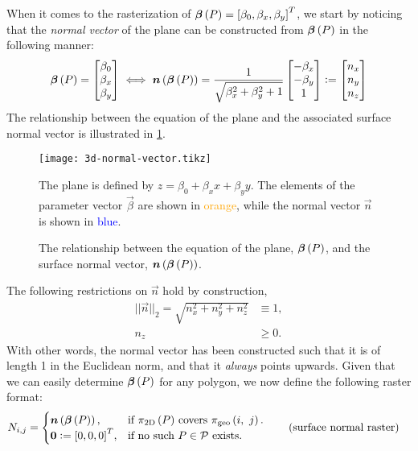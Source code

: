 When it comes to the rasterization of $\boldsymbol{\beta}\left(P\right) = {[\beta_0, \beta_x, \beta_y]}^T$, we start by noticing that the \textit{normal vector} of the plane can be constructed from $\boldsymbol{\beta}\left(P\right)$ in the following manner:
\begin{equation*}
  \boldsymbol{\beta}\left(P\right)
  =
  \begin{bmatrix}
    \beta_0\\
    \beta_x\\
    \beta_y\\
  \end{bmatrix}
  \iff
  \boldsymbol{n}\left(\boldsymbol{\beta}\left(P\right)\right)
  =
  \frac{1}{\sqrt{\beta_x^2 + \beta_y^2 + 1}}
  \begin{bmatrix}
    -\beta_x\\
    -\beta_y\\
    1
  \end{bmatrix}
  \vcentcolon=
  \begin{bmatrix}
    n_x\\
    n_y\\
    n_z
  \end{bmatrix}
\end{equation*}
The relationship between the equation of the plane and the associated surface normal vector is illustrated in \cref{fig:3d-normal-vector}.
\begin{figure}[H]
  \centering
  \texttt{[image: 3d-normal-vector.tikz]}
  \caption{%
    The relationship between the equation of the plane, $\boldsymbol{\beta}\left(P\right)$, and the surface normal vector, $\boldsymbol{n}\left(\boldsymbol{\beta}\left(P\right)\right)$.
  }{%
    The plane is defined by $z = \beta_0 + \beta_x x + \beta_y y$.
    The elements of the parameter vector $\vec{\beta}$ are shown in \textcolor{orange}{orange}, while the normal vector $\vec{n}$ is shown in \textcolor{blue}{blue}.
  }%
  \label{fig:3d-normal-vector}
\end{figure}
\noindent
The following restrictions on $\vec{n}$ hold by construction,
\begin{align*}
  ||\vec{n}||_2 = \sqrt{n_x^2 + n_y^2 + n_z^2} &\equiv 1,
  \\
  n_z &\geq 0.
\end{align*}
With other words, the normal vector has been constructed such that it is of length 1 in the Euclidean norm, and that it \emph{always} points upwards.
\noindent
Given that we can easily determine $\boldsymbol{\beta}\left(P\right)$ for any polygon, we now define the following raster format:
\begin{align*}
  N_{i,j} &= \begin{cases}
    \boldsymbol{n}\left(\boldsymbol{\beta}\left(P\right)\right), &\text{if $\pi_{\mathrm{2D}}\left(P\right)$ covers } \pi_{\mathrm{geo}}\left(i,~j\right).\\
    \boldsymbol{0} \vcentcolon= {[0, 0, 0]}^T, &\text{if no such } P \in \mathcal{P} \text{ exists.}
  \end{cases}
  \tag{surface normal raster}
\end{align*}
